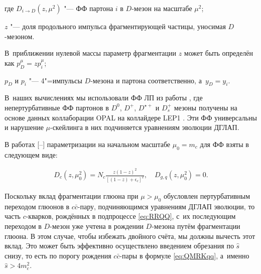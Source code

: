 где $D_{i\to D}(z,\mu^2)$ "--- ФФ партона $i$ в $D$-мезон на масштабе $\mu^2$; 

$z$ "--- доля продольного импульса фрагментирующей частицы, уносимая $D$-мезоном. 

В~приближении нулевой массы параметр фрагментации $z$ может быть определён как $p_D^\mu=zp_i^\mu$; 

$p_D$ и $p_i$ "--- 4"=импульсы $D$-мезона и партона соответственно, а~${y_D=y_i}$. 

В~наших вычислениях мы использовали ФФ ЛП из работы \cite{KniehlKramer}, где непертурбативные ФФ партонов в $D^0$, $D^+$, $D^{\star +}$  и $D_s^+$ мезоны получены на основе данных коллаборации OPAL на коллайдере LEP1 \cite{LEP10,LEP11}. Эти ФФ универсальны и нарушение  $\mu$-скейлинга в них подчиняется уравнениям эволюции ДГЛАП.

В работах [--] параметризации на начальном масштабе $\mu_0=m_c$ для ФФ взяты в следующем виде:

\begin{gather}

D_{c}(z,\mu_0^2)=N_{c}\frac{z(1-z)^2}{[(1-z)+\epsilon_{c}]^2},\quad 

D_{g,q}(z,\mu_0^2)=0.\label{eq:start}

\end{gather}



Поскольку вклад фрагментации глюона при $\mu>\mu_0$ обусловлен пертурбативным переходом глюонов в $c\bar c$-пару, подчиняющимся уравнениям ДГЛАП эволюции, то часть $c$-кварков, рождённых в подпроцессе \eqref{eq:RRQQ}, с~их последующим переходом в $D$-мезон уже учтена в рождении $D$-мезона путём фрагментации глюона. В этом случае, чтобы избежать двойного счёта, мы должны вычесть этот вклад. Это может быть эффективно осуществлено введением обрезания по $\hat s$ снизу, то есть по порогу рождения $c\bar c$-пары в формуле \eqref{eq:QMRKqq}, а~именно $\hat s>4m_c^2$.



\smallskip





